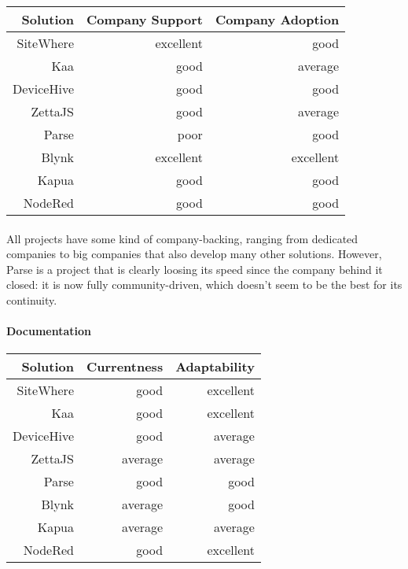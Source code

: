 \documentclass{article}
\begin{document}
\begin{center}
\begin{tabular}{r|r|r}
Solution & Company Support & Company Adoption \\ \hline
SiteWhere & \cellcolor{green!25}excellent & \cellcolor{blue!10}good \\
Kaa & \cellcolor{blue!10}good & \cellcolor{yellow!25}average \\
DeviceHive & \cellcolor{blue!10}good & \cellcolor{blue!10}good \\
ZettaJS & \cellcolor{blue!10}good & \cellcolor{yellow!25}average \\
Parse & \cellcolor{orange!25}poor & \cellcolor{blue!10}good \\
Blynk & \cellcolor{green!25}excellent & \cellcolor{green!25}excellent \\
Kapua & \cellcolor{blue!10}good & \cellcolor{blue!10}good \\
NodeRed & \cellcolor{blue!10}good & \cellcolor{blue!10}good \\
\end{tabular}
\end{center}

\paragraph{} All projects have some kind of company-backing, ranging from dedicated companies to big companies that also develop many other solutions. However, Parse is a project that is clearly loosing its speed since the company behind it closed: it is now fully community-driven, which doesn't seem to be the best for its continuity.

\paragraph{Documentation}

\begin{center}
\begin{tabular}{r|r|r}
Solution & Currentness & Adaptability \\ \hline
SiteWhere & \cellcolor{blue!10}good & \cellcolor{green!25}excellent \\
Kaa & \cellcolor{blue!10}good & \cellcolor{green!25}excellent \\
DeviceHive & \cellcolor{blue!10}good & \cellcolor{yellow!25}average \\
ZettaJS & \cellcolor{yellow!25}average & \cellcolor{yellow!25}average \\
Parse & \cellcolor{blue!10}good & \cellcolor{blue!10}good \\
Blynk & \cellcolor{yellow!25}average & \cellcolor{blue!10}good \\
Kapua & \cellcolor{yellow!25}average & \cellcolor{yellow!25}average \\
NodeRed & \cellcolor{blue!10}good & \cellcolor{green!25}excellent \\
\end{tabular}
\end{center}
\end{document}
